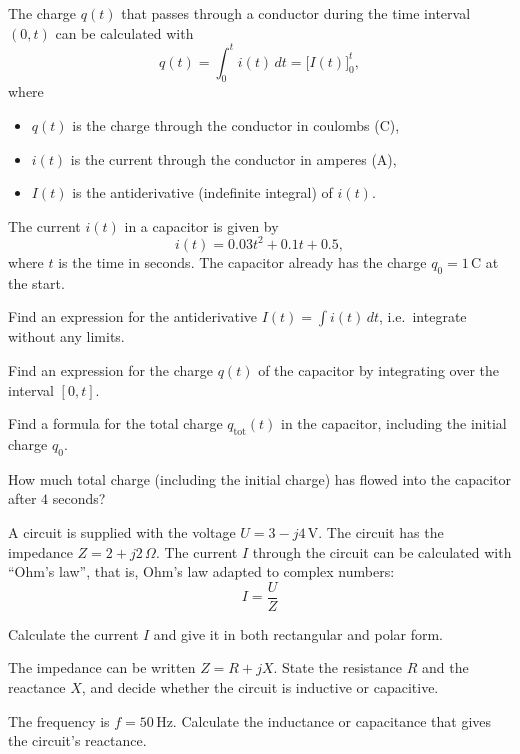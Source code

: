 The charge $q(t)$ that passes through a conductor during the time interval $(0, t)$ can be
calculated with
\[
  q(t) = \int_0^t i(t)\,dt = \bigl[I(t)\bigr]_0^t,
\]
where
\begin{itemize}
  \item $q(t)$ is the charge through the conductor in coulombs (C),
  \item $i(t)$ is the current through the conductor in amperes (A),
  \item $I(t)$ is the antiderivative (indefinite integral) of $i(t)$.
\end{itemize}
The current $i(t)$ in a capacitor is given by
\[
  i(t) = 0.03t^2 + 0.1t + 0.5,
\]
where $t$ is the time in seconds. The capacitor already has the charge $q_0 = 1\,\text{C}$ at the
start.
\begin{parts}
  \item Find an expression for the antiderivative $I(t) = \int i(t)\,dt$, i.e.\ integrate
    without any limits.
  \item Find an expression for the charge $q(t)$ of the capacitor by integrating over the interval
    $[0, t]$.
  \item Find a formula for the total charge $q_{\text{tot}}(t)$ in the capacitor, including the
    initial charge $q_0$.
  \item How much total charge (including the initial charge) has flowed into the capacitor after
    $4$ seconds?
\end{parts}

A circuit is supplied with the voltage $U = 3 - j4\,\text{V}$. The circuit has the impedance
$Z = 2 + j2\,\Omega$. The current $I$ through the circuit can be calculated with “Ohm's law”, that
is, Ohm's law adapted to complex numbers:
\[
  I = \frac{U}{Z}
\]
\begin{parts}
  \item Calculate the current $I$ and give it in both rectangular and polar form.
  \item The impedance can be written $Z = R + jX$. State the resistance $R$ and the reactance $X$,
    and decide whether the circuit is inductive or capacitive.
  \item The frequency is $f = 50\,\text{Hz}$. Calculate the inductance or capacitance that gives
    the circuit's reactance.
\end{parts}

